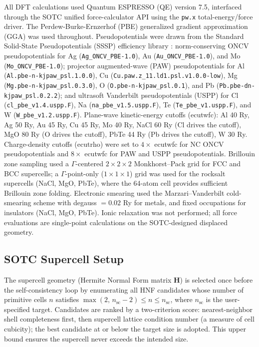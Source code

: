 \documentclass[aps,prb,reprint,amsmath,amssymb,floatfix]{revtex4-2}
\begin{document}
All DFT calculations used Quantum ESPRESSO (QE) \cite{ref46} version
7.5, interfaced through the SOTC unified force-calculator API using the
\texttt{pw.x} total-energy/force driver. The Perdew-Burke-Ernzerhof
(PBE) generalized gradient approximation (GGA) \cite{ref17} was used
throughout. Pseudopotentials were drawn from the Standard Solid-State
Pseudopotentials (SSSP) efficiency library \cite{ref47}: norm-conserving ONCV
pseudopotentials for Ag (\texttt{Ag\_ONCV\_PBE-1.0}), Au
(\texttt{Au\_ONCV\_PBE-1.0}), and Mo (\texttt{Mo\_ONCV\_PBE-1.0});
projector augmented-wave (PAW) pseudopotentials for Al
(\texttt{Al.pbe-n-kjpaw\_psl.1.0.0}), Cu
(\texttt{Cu.paw.z\_11.ld1.psl.v1.0.0-low}), Mg
(\texttt{Mg.pbe-n-kjpaw\_psl.0.3.0}), O
(\texttt{O.pbe-n-kjpaw\_psl.0.1}), and Pb
(\texttt{Pb.pbe-dn-kjpaw\_psl.0.2.2}); and ultrasoft Vanderbilt
pseudopotentials (USPP) for Cl (\texttt{cl\_pbe\_v1.4.uspp.F}), Na
(\texttt{na\_pbe\_v1.5.uspp.F}), Te (\texttt{Te\_pbe\_v1.uspp.F}), and W
(\texttt{W\_pbe\_v1.2.uspp.F}). Plane-wave kinetic-energy cutoffs
(ecutwfc): Al 40 Ry, Ag 50 Ry, Au 45 Ry, Cu 45 Ry, Mo 40 Ry, NaCl 60 Ry
(Cl drives the cutoff), MgO 80 Ry (O drives the cutoff), PbTe 44 Ry (Pb
drives the cutoff), W 30 Ry. Charge-density cutoffs (ecutrho) were set
to \(4\times\) ecutwfc for NC ONCV pseudopotentials and \(8\times\)
ecutwfc for PAW and USPP pseudopotentials. Brillouin zone sampling used
a \(\Gamma\)-centered \(2\times2\times2\) Monkhorst--Pack grid for FCC
and BCC supercells; a \(\Gamma\)-point-only (\(1\times1\times1\)) grid
was used for the rocksalt supercells (NaCl, MgO, PbTe), where the
64-atom cell provides sufficient Brillouin zone folding. Electronic
smearing used the Marzari--Vanderbilt cold-smearing scheme \cite{ref18}
with degauss \(= 0.02\) Ry for metals, and fixed occupations for
insulators (NaCl, MgO, PbTe). Ionic relaxation was not performed; all
force evaluations are single-point calculations on the SOTC-designed
displaced geometry.

\subsection{SOTC Supercell Setup}\label{sotc-supercell-setup}

The supercell geometry (Hermite Normal Form matrix \(\mathbf{H}\)) is
selected once before the self-consistency loop by enumerating all HNF
candidates whose number of primitive cells \(n\) satisfies
\(\max(2,\,n_\text{sc}-2) \le n \le n_\text{sc}\), where
\(n_\text{sc}\) is the user-specified target. Candidates are ranked by a
two-criterion score: nearest-neighbor shell completeness first, then
supercell lattice condition number (a measure of cell cubicity); the best candidate at or below the
target size is adopted. This upper bound ensures the supercell never
exceeds the intended size.
\end{document}
